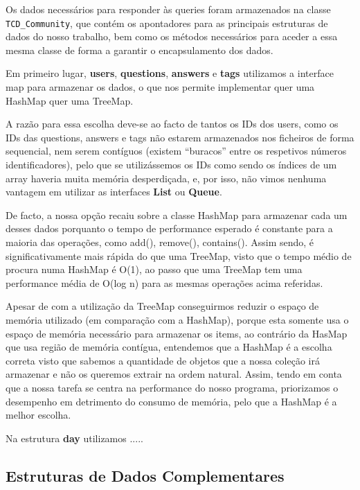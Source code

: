 \documentclass[a4paper]{article}
\begin{document}
\vspace{0.2cm}

Os dados necessários para responder às queries foram armazenados
na classe \texttt{TCD\_Community}, que contém os apontadores para as principais
estruturas de dados do nosso trabalho, bem como os métodos necessários para aceder
a essa mesma classe de forma a garantir o encapsulamento dos dados.


Em primeiro lugar, \textbf{users}, \textbf{questions},
\textbf{answers} e \textbf{tags}
utilizamos a interface map para armazenar os dados,
o que nos permite implementar quer uma HashMap quer uma TreeMap. \par
A razão para essa escolha deve-se ao facto de tantos os IDs dos users, como os
IDs das questions, answers e tags não estarem armazenados nos ficheiros de forma
sequencial, nem serem contíguos (existem ``buracos'' entre os respetivos números
identificadores), pelo que se utilizássemos os IDs como sendo os índices de um
array haveria muita memória desperdiçada, e, por isso, não vimos nenhuma vantagem
em utilizar as interfaces \textbf{List} ou \textbf{Queue}. \par
De facto, a nossa opção recaiu sobre a classe HashMap para armazenar cada um desses
dados porquanto o tempo de performance esperado é constante para a maioria das
operações, como add(), remove(), contains(). Assim sendo, é significativamente
mais rápida do que uma TreeMap, visto que o tempo médio de procura numa HashMap
é O(1), ao passo que uma TreeMap tem uma performance média de O(log n) para as
mesmas operações acima referidas. \par
Apesar de com a utilização da TreeMap conseguirmos reduzir o espaço de memória
utilizado (em comparação com a HashMap), porque esta somente usa o espaço de
memória necessário para armazenar os items, ao contrário da HasMap que usa região
de memória contígua, entendemos que a HashMap é a escolha correta visto que sabemos
a quantidade de objetos que a nossa coleção irá armazenar e não os queremos extrair
na ordem natural. Assim, tendo em conta que a nossa tarefa se centra na performance
do nosso programa, priorizamos o desempenho em detrimento do consumo de memória,
pelo que a HashMap é a melhor escolha.


Na estrutura \textbf{day} utilizamos .....


\subsection{Estruturas de Dados Complementares}
\label{sec:dados_complementares}
\end{document}
